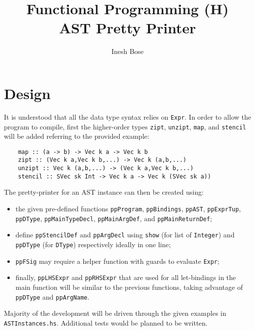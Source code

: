 \documentclass{article}
\title{%
    Functional Programming (H)\\
    AST Pretty Printer
}
\author{Inesh Bose}
\date{}
\begin{document}
\maketitle

\section*{Design}

It is understood that all the data type syntax relies on \texttt{Expr}. In order to allow the program to compile, first the higher-order types \texttt{zipt}, \texttt{unzipt}, \texttt{map}, and \texttt{stencil} will be added referring to the provided example:

\begin{verbatim}
    map :: (a -> b) -> Vec k a -> Vec k b
    zipt :: (Vec k a,Vec k b,...) -> Vec k (a,b,...)
    unzipt :: Vec k (a,b,...) -> (Vec k a,Vec k b,...)
    stencil :: SVec sk Int -> Vec k a -> Vec k (SVec sk a))
\end{verbatim}

\noindent The pretty-printer for an AST instance can then be created using:

\begin{itemize}
    \item the given pre-defined functions \texttt{ppProgram}, \texttt{ppBindings}, \texttt{ppAST}, \texttt{ppExprTup}, \texttt{ppDType}, \texttt{ppMainTypeDecl}, \texttt{ppMainArgDef}, and \texttt{ppMainReturnDef};
    \item define \texttt{ppStencilDef} and \texttt{ppArgDecl} using \texttt{show} (for list of \texttt{Integer}) and \texttt{ppDType} (for \texttt{DType}) respectively ideally in one line;
    \item \texttt{ppFSig} may require a helper function with guards to evaluate \texttt{Expr};
    \item finally, \texttt{ppLHSExpr} and \texttt{ppRHSExpr} that are used for all let-bindings in the main function will be similar to the previous functions, taking advantage of \texttt{ppDType} and \texttt{ppArgName}.
\end{itemize}

\noindent Majority of the development will be driven through the given examples in \texttt{ASTInstances.hs}. Additional tests would be planned to be written.
\end{document}
